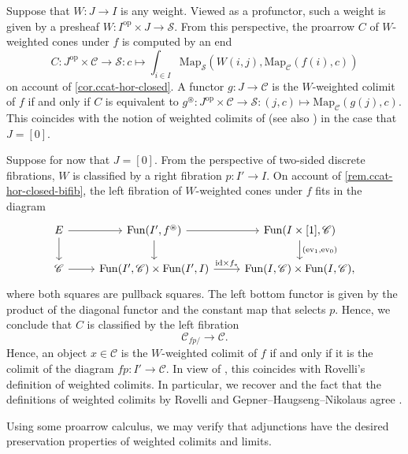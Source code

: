 \documentclass[a4paper, 11pt]{amsart}
\numberwithin{theorem}{section}
\theoremstyle{definition}
\newcommand{\op}{\mathrm{op}}
\newcommand{\map}{\mathrm{Map}}
\newcommand{\fun}{\mathrm{Fun}}
\renewcommand{\S}{\mathscr{S}}
\newcommand{\C}{\mathscr{C}}
\newcommand{\ev}{\mathrm{ev}}
\newcommand{\id}{\mathrm{id}}
\begin{document}
\begin{example}\label{ex.ccat-weighted-colimits}
	Suppose that $W : J \rightarrow I$ is any weight. Viewed as a profunctor, 
	such a weight is given by a presheaf $W : I^\op \times J \rightarrow \S$. From this perspective, the proarrow $C$ of $W$-weighted cones under $f$ is computed by an end
	$$
	C : J^\op \times \C \rightarrow \S : c \mapsto \int_{i \in I} \map_\S(W(i,j), \map_\C(f(i), c))
	$$
	on account of \cref{cor.ccat-hor-closed}.
	A functor $g : J \to \C$ is the $W$-weighted colimit of $f$ if and only if $C$ is equivalent to $g^\circledast : J^\op \times \C \to \S : (j,c) \mapsto \map_\C(g(j), c)$. This coincides with the notion of weighted colimits of \cite{GepnerHaugsengNikolaus} (see also \cite[Section 4]{HaugsengEnds}) in the case that $J=[0]$.

	Suppose for now that $J = [0]$. From the perspective of two-sided discrete fibrations, $W$ is classified by a right fibration $p : I' \rightarrow I$. 
On account of \cref{rem.ccat-hor-closed-bifib}, the left fibration
of $W$-weighted cones under $f$ fits in the diagram 
\[
	\begin{tikzcd}
	E \arrow[r]\arrow[d]& \fun(I', f^\circledast) \arrow[r]\arrow[d] & \fun(I \times [1], \C) \arrow[d, "{(\ev_1, \ev_0)}"] \\ 
	\C \arrow[r] & \fun(I', \C) \times \fun(I', I) \arrow[r, "\id \times f_*"] & \fun(I,\C) \times \fun(I,\C),
	\end{tikzcd}
\]
where both squares are pullback squares. The left bottom functor is given by the product of the diagonal functor 
and  
the constant map that selects $p$. Hence, we conclude that $C$ is classified by the left fibration
	$$
	\C_{fp/} \rightarrow \C.
	$$
	Hence, an object $x \in \C$ is the $W$-weighted colimit of $f$ if and only if it is the colimit of the diagram $fp : I' \rightarrow \C$.
	In view of \cite[Theorem 2.37]{Rovelli}, this coincides with Rovelli's definition of weighted colimits. In particular, we recover \cite[Theorem 1.2]{HaugsengEnds} and the fact that the definitions of weighted colimits by Rovelli and Gepner--Haugseng--Nikolaus agree \cite[Corollary 4.5]{HaugsengEnds}.
\end{example}

Using some proarrow calculus, we may verify that adjunctions have the desired preservation properties of weighted colimits and limits. 
\end{document}

